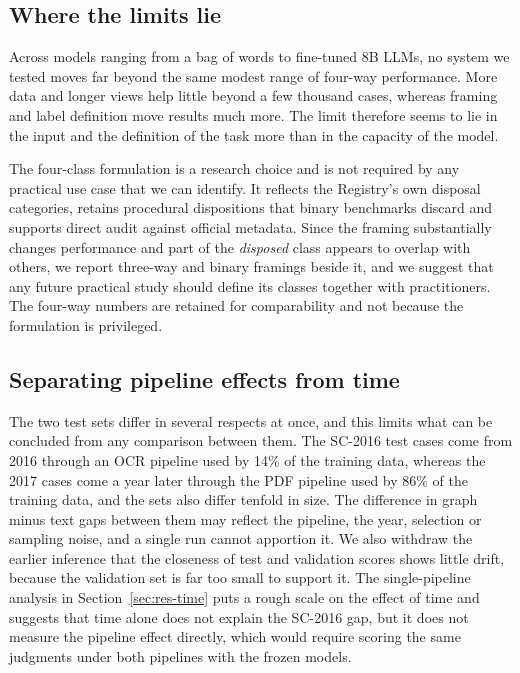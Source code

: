 \documentclass[11pt,a4paper]{article}
\newcommand{\cls}[1]{\emph{#1}}
\begin{document}
\subsection{Where the limits lie}
Across models ranging from a bag of words to fine-tuned 8B LLMs, no system we tested moves far beyond the same modest range of four-way performance. More data and longer views help little beyond a few thousand cases, whereas framing and label definition move results much more. The limit therefore seems to lie in the input and the definition of the task more than in the capacity of the model.

The four-class formulation is a research choice and is not required by any practical use case that we can identify. It reflects the Registry's own disposal categories, retains procedural dispositions that binary benchmarks discard and supports direct audit against official metadata. Since the framing substantially changes performance and part of the \cls{disposed} class appears to overlap with others, we report three-way and binary framings beside it, and we suggest that any future practical study should define its classes together with practitioners. The four-way numbers are retained for comparability and not because the formulation is privileged.

\subsection{Separating pipeline effects from time}
The two test sets differ in several respects at once, and this limits what can be concluded from any comparison between them. The SC-2016 test cases come from 2016 through an OCR pipeline used by 14\% of the training data, whereas the 2017 cases come a year later through the PDF pipeline used by 86\% of the training data, and the sets also differ tenfold in size. The difference in graph minus text gaps between them may reflect the pipeline, the year, selection or sampling noise, and a single run cannot apportion it. We also withdraw the earlier inference that the closeness of test and validation scores shows little drift, because the validation set is far too small to support it. The single-pipeline analysis in Section~\ref{sec:res-time} puts a rough scale on the effect of time and suggests that time alone does not explain the SC-2016 gap, but it does not measure the pipeline effect directly, which would require scoring the same judgments under both pipelines with the frozen models.
\end{document}
